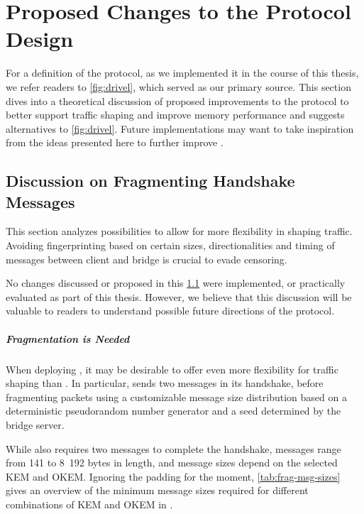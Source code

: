 \chapter{Proposed Changes to the Protocol Design}\label{ch:protocol-changes}

For a definition of the \drivel{} protocol, as we implemented it in the course of this thesis, we refer readers to \cref{fig:drivel}, which served as our primary source.
This section dives into a theoretical discussion of proposed improvements to the protocol to better support traffic shaping and improve memory performance and suggests alternatives to \cref{fig:drivel}.
Future implementations may want to take inspiration from the ideas presented here to further improve \drivel{}.

\section{Discussion on Fragmenting Handshake Messages} \label{ssec:fragmentation}

This section analyzes possibilities to allow for more flexibility in shaping \drivel{} traffic. Avoiding fingerprinting based on certain sizes, directionalities and timing of messages between client and bridge is crucial to evade censoring.

No changes discussed or proposed in this \cref{ssec:fragmentation} were implemented, or practically evaluated as part of this thesis. However, we believe that this discussion will be valuable to readers to understand possible future directions of the protocol.

\paragraph{Fragmentation is Needed}
When deploying \drivel{}, it may be desirable to offer even more flexibility for traffic shaping than \obfsfour{}. In particular, \obfsfour{} sends two messages in its handshake, before fragmenting packets using a customizable message size distribution based on a deterministic pseudorandom number generator and a seed determined by the bridge server.

While \drivel{} also requires two messages to complete the handshake, \obfsfour{} messages range from 141 to 8~192 bytes in length, and \drivel{} message sizes depend on the selected KEM and OKEM. Ignoring the padding for the moment, \cref{tab:frag-msg-sizes} gives an overview of the minimum message sizes required for different combinations of KEM and OKEM in \drivel{}.

